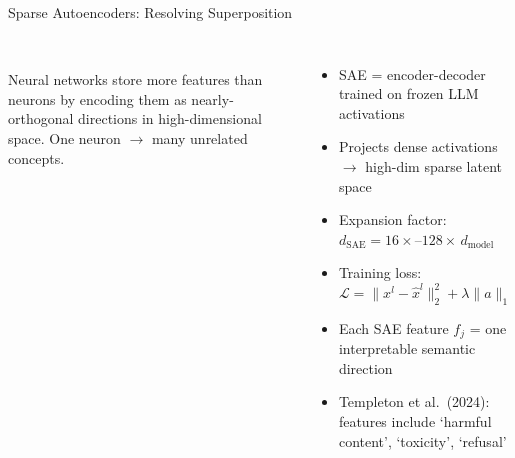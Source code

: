 \begin{frame}{Sparse Autoencoders: Resolving Superposition}
  \begin{columns}[T]
    {\small\bfseries{}}\\[0.2em]
    {\footnotesize Neural networks store more features than neurons by encoding
      them as nearly-orthogonal directions in high-dimensional space.
      One neuron $\to$ many unrelated concepts.}
    \vspace{0.4em}

    {\small\bfseries{}}
    \begin{itemize}\footnotesize\setlength\itemsep{3pt}
      \item SAE = encoder-decoder trained on frozen LLM activations
      \item Projects dense activations $\to$ high-dim sparse latent space
      \item Expansion factor: $d_{\text{SAE}} = 16\times\text{–}128\times\, d_{\text{model}}$
      \item Training loss: $\mathcal{L} = \|x^l - \hat{x}^l\|_2^2 + \lambda\|a\|_1$
      \item Each SAE feature $f_j$ = one interpretable semantic direction
      \item Templeton et al.\ (2024): features include `harmful content',
        `toxicity', `refusal'
    \end{itemize}


\end{columns}
\end{frame}
